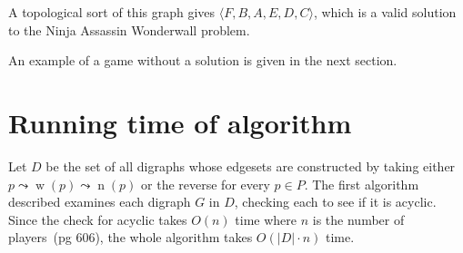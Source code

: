 \documentclass[12pt,x11names, rgb]{article}
\DeclareMathOperator{\w}{w}
\DeclareMathOperator{\n}{n}
\begin{document}
\begin{center}

    \end{center}

    A topological sort of this graph gives $\langle F, B, A, E, D, C \rangle$, which is a valid solution to the Ninja Assassin Wonderwall problem. 

    An example of a game without a solution is given in the next section.

\section{Running time of algorithm}
\label{sec:run-time}
    Let $D$ be the set of all digraphs whose edgesets are constructed by taking either $p \leadsto \w(p) \leadsto \n(p)$ or the reverse for every $p\in P$. The first algorithm described examines each digraph $G$ in $D$, checking each to see if it is acyclic. Since the check for acyclic takes $O(n)$ time where $n$ is the number of players~\cite{clrs}(pg 606), the whole algorithm takes $O(\lvert D \rvert \cdot n)$ time. 
\end{document}
